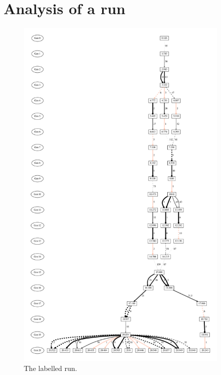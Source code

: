 \section{Analysis of a run}

\begin{figure}[tb!p] %
	\begin{center}
		\includegraphics[width=0.9\textwidth]{../figures/run0_filtered_BandW}
	\end{center}
	\caption{The labelled run.}
	\label{fig:run0Labelled}       %
\end{figure}

